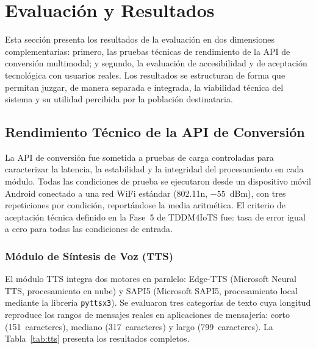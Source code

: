 \documentclass[journal]{IEEEtran}
\begin{document}
	\section{Evaluaci\'on y Resultados}
	\label{sec:evaluacion}
	Esta secci\'on presenta los resultados de la evaluaci\'on en dos dimensiones complementarias: primero, las pruebas t\'ecnicas de rendimiento de la API de conversi\'on multimodal; y segundo, la evaluaci\'on de accesibilidad y de aceptaci\'on tecnol\'ogica con usuarios reales. Los resultados se estructuran de forma que permitan juzgar, de manera separada e integrada, la viabilidad t\'ecnica del sistema y su utilidad percibida por la poblaci\'on destinataria.
	
	\subsection{Rendimiento T\'ecnico de la API de Conversi\'on}
	La API de conversi\'on fue sometida a pruebas de carga controladas para caracterizar la latencia, la estabilidad y la integridad del procesamiento en cada m\'odulo. Todas las condiciones de prueba se ejecutaron desde un dispositivo m\'ovil Android conectado a una red WiFi est\'andar (802.11n, $-55$~dBm), con tres repeticiones por condici\'on, report\'andose la media aritm\'etica. El criterio de aceptaci\'on t\'ecnica definido en la Fase~5 de TDDM4IoTS fue: tasa de error igual a cero para todas las condiciones de entrada.
	
	\subsubsection{M\'odulo de S\'intesis de Voz (TTS)}
	El m\'odulo TTS integra dos motores en paralelo: Edge-TTS (Microsoft Neural TTS, procesamiento en nube) y SAPI5 (Microsoft SAPI5, procesamiento local mediante la librer\'ia \texttt{pyttsx3}). Se evaluaron tres categor\'ias de texto cuya longitud reproduce los rangos de mensajes reales en aplicaciones de mensajer\'ia: corto (151~caracteres), mediano (317~caracteres) y largo (799~caracteres). La Tabla~\ref{tab:tts} presenta los resultados completos.
	
\end{document}
